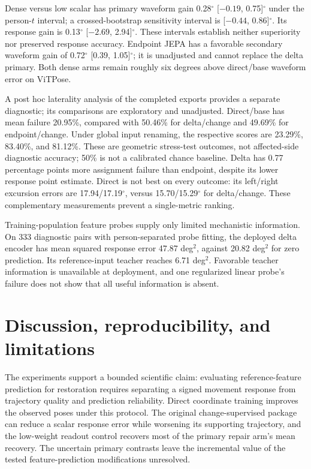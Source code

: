 \documentclass{article}
\newcommand{\degunit}{^{\circ}}
\begin{document}
Dense versus low scalar has primary waveform gain 0.28$\degunit$ [${-0.19}$, 0.75]$\degunit$ under the person-$t$ interval; a crossed-bootstrap sensitivity interval is [${-0.44}$, 0.86]$\degunit$. Its response gain is 0.13$\degunit$ [${-2.69}$, 2.94]$\degunit$. These intervals establish neither superiority nor preserved response accuracy. Endpoint JEPA has a favorable secondary waveform gain of 0.72$\degunit$ [0.39, 1.05]$\degunit$; it is unadjusted and cannot replace the delta primary. Both dense arms remain roughly six degrees above direct/base waveform error on ViTPose.

A post hoc laterality analysis of the completed exports provides a separate diagnostic; its comparisons are exploratory and unadjusted. Direct/base has mean failure 20.95\%, compared with 50.46\% for delta/change and 49.69\% for endpoint/change. Under global input renaming, the respective scores are 23.29\%, 83.40\%, and 81.12\%. These are geometric stress-test outcomes, not affected-side diagnostic accuracy; 50\% is not a calibrated chance baseline. Delta has 0.77 percentage points more assignment failure than endpoint, despite its lower response point estimate. Direct is not best on every outcome: its left/right excursion errors are 17.94/17.19$\degunit$, versus 15.70/15.29$\degunit$ for delta/change. These complementary measurements prevent a single-metric ranking.

Training-population feature probes supply only limited mechanistic information. On 333 diagnostic pairs with person-separated probe fitting, the deployed delta encoder has mean squared response error 47.87 deg$^2$, against 20.82 deg$^2$ for zero prediction. Its reference-input teacher reaches 6.71 deg$^2$. Favorable teacher information is unavailable at deployment, and one regularized linear probe's failure does not show that all useful information is absent.

\clearpage
\section{Discussion, reproducibility, and limitations}
The experiments support a bounded scientific claim: evaluating reference-feature prediction for restoration requires separating a signed movement response from trajectory quality and prediction reliability. Direct coordinate training improves the observed poses under this protocol. The original change-supervised package can reduce a scalar response error while worsening its supporting trajectory, and the low-weight readout control recovers most of the primary repair arm's mean recovery. The uncertain primary contrasts leave the incremental value of the tested feature-prediction modifications unresolved.
\end{document}
